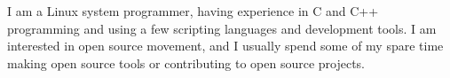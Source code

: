 \documentclass[a4paper,12pt]{memoir} %
\begin{document}
\userinformation %

\framebreak %


\CVDate




{I am a Linux system programmer, having experience in C and C++ programming and using a few scripting languages and development tools. I am interested in open source movement, and I usually spend some of my spare time making open source tools or contributing to open source projects.}


\SmallSep %








\end{document}
